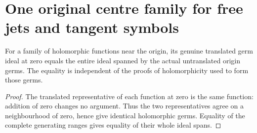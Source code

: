 \section{One original centre family for free jets and tangent symbols}

\begin{lemma}
\label{hir:actual-coupled-zero-translation-generators}
\leanok
For a family of holomorphic functions near the origin, its genuine
translated germ ideal at zero equals the entire ideal spanned by the actual
untranslated origin germs. The equality is independent of the proofs of
holomorphicity used to form those germs.
\end{lemma}
\begin{proof}
The translated representative of each function at zero is the same function:
addition of zero changes no argument. Thus the two representatives agree on
a neighbourhood of zero, hence give identical holomorphic germs. Equality of
the complete generating ranges gives equality of their whole ideal spans.
\end{proof}

